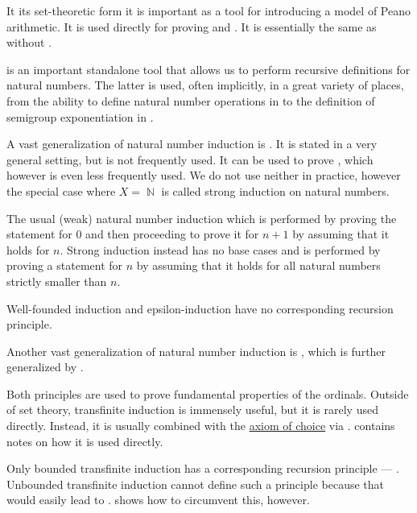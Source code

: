 \begin{concept}
\begin{thmenum}
    It its set-theoretic form  it is important as a tool for introducing a model of Peano arithmetic. It is used directly for proving  and . It is essentially the same as  without .

     is an important standalone tool that allows us to perform recursive definitions for natural numbers. The latter is used, often implicitly, in a great variety of places, from the ability to define natural number operations in  to the definition of semigroup exponentiation in .

     A vast generalization of natural number induction is . It is stated in a very general setting, but is not frequently used. It can be used to prove , which however is even less frequently used. We do not use neither in practice, however the special case where \( X = \BbbN \) is called strong induction on natural numbers.

    The usual (weak) natural number induction which is performed by proving the statement for \( 0 \) and then proceeding to prove it for \( n + 1 \) by assuming that it holds for \( n \). Strong induction instead has no base cases and is performed by proving a statement for \( n \) by assuming that it holds for all natural numbers strictly smaller than \( n \).

    Well-founded induction and epsilon-induction have no corresponding recursion principle.

     Another vast generalization of natural number induction is , which is further generalized by .

    Both principles are used to prove fundamental properties of the ordinals. Outside of set theory, transfinite induction is immensely useful, but it is rarely used directly. Instead, it is usually combined with the \hyperref[def:zfc/choice]{axiom of choice} via .  contains notes on how it is used directly.

    Only bounded transfinite induction has a corresponding recursion principle --- . Unbounded transfinite induction cannot define such a principle because that would easily lead to .  shows how to circumvent this, however.


\end{thmenum}
\end{concept}
